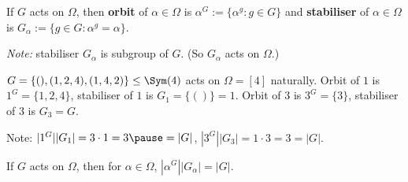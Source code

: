 \begin{slide}
    \begin{definition}
        \vspace{0pt}
        If $G$ acts on $\Omega$, then \textbf{orbit} of $\alpha \in \Omega$ is $\alpha^G := \{\alpha^g : g \in G\}$ and \textbf{stabiliser} of $\alpha \in \Omega$ is $G_\alpha := \{g \in G : \alpha^g = \alpha\}$.
    \end{definition}

    \textit{Note:} stabiliser $G_\alpha$ is subgroup of $G$. (So $G_\alpha$ acts on $\Omega$.)

    \begin{example}
        \vspace{0pt}
        $G = \{(),(1,2,4),(1,4,2)\} \leq \Sym(4)$ acts on $\Omega = [4]$ naturally. Orbit of $1$ is \pause $1^G = \{1,2,4\}$, stabiliser of $1$ is \pause $G_1 = \{()\} = 1$. Orbit of $3$ is \pause $3^G = \{3\}$, stabiliser of $3$ is \pause $G_3 = G$. \pause

        Note: $|1^G||G_1| = 3 \cdot 1 = 3 \pause = |G|$, \pause $|3^G||G_3| = 1 \cdot 3 = 3 = |G|$.
    \end{example} \pause

    \begin{theorem}
        \vspace{0pt}
        If $G$ acts on $\Omega$, then for $\alpha \in \Omega$, $|\alpha^G||G_\alpha| = |G|$.
    \end{theorem}
\end{slide}